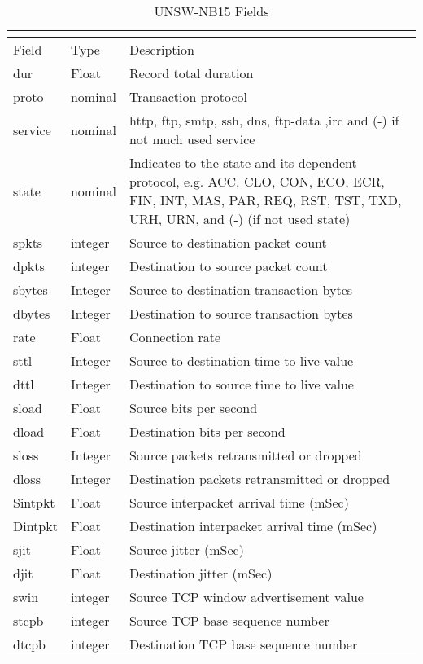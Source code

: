 \begin{longtable}{@{}p{}p{}p{}@{}}
\caption{UNSW-NB15 Fields}\\
\label{unswfieldstable}\\
\toprule
Field & Type & Description \\ \midrule
dur & Float & Record total duration \\
proto & nominal & Transaction protocol \\
service & nominal & http, ftp, smtp, ssh, dns, ftp-data ,irc  and (-) if not much used service \\
state & nominal & Indicates to the state and its dependent protocol, e.g. ACC, CLO, CON, ECO, ECR, FIN, INT, MAS, PAR, REQ, RST, TST, TXD, URH, URN, and (-) (if not used state) \\
spkts & integer & Source to destination packet count \\
dpkts & integer & Destination to source packet count \\
sbytes & Integer & Source to destination transaction bytes \\
dbytes & Integer & Destination to source transaction bytes \\
rate & Float & Connection rate \\
sttl & Integer & Source to destination time to live value \\
dttl & Integer & Destination to source time to live value \\
sload & Float & Source bits per second \\
dload & Float & Destination bits per second \\
sloss & Integer & Source packets retransmitted or dropped \\
dloss & Integer & Destination packets retransmitted or dropped \\
Sintpkt & Float & Source interpacket arrival time (mSec) \\
Dintpkt & Float & Destination interpacket arrival time (mSec) \\
sjit & Float & Source jitter (mSec) \\
djit & Float & Destination jitter (mSec) \\
swin & integer & Source TCP window advertisement value \\
stcpb & integer & Source TCP base sequence number \\
dtcpb & integer & Destination TCP base sequence number \\

\end{longtable}
